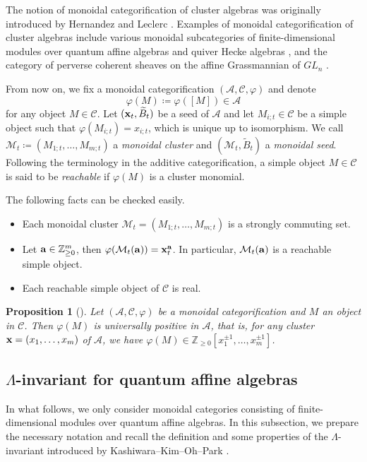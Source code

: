 \documentclass[12pt]{amsart}
\newtheorem{proposition}[theorem]{Proposition}
\theoremstyle{definition}
\theoremstyle{remark}
\numberwithin{equation}{section}
\begin{document}
The notion of monoidal categorification of cluster algebras was originally introduced by Hernandez and Leclerc \cite{HL_2010}. 
Examples of monoidal categorification of cluster algebras include various monoidal subcategories of finite-dimensional modules over quantum affine algebras and quiver Hecke algebras \cite{HL16, kkko-2018, kkop-2024}, and the category of perverse coherent sheaves on the affine Grassmannian of $GL_n$ \cite{CW19}.

From now on, we fix a monoidal categorification $(\mathcal A, \mathcal C, \varphi)$ and denote \[\varphi(M) \coloneqq \varphi([M])\in\mathcal A\]
for any object $M\in\mathcal C$. Let $({\bf x}_t,\widetilde B_t)$ be a seed of $\mathcal A$ and let $M_{i;t}\in\mathcal C$ be a simple object such that $\varphi(M_{i;t})=x_{i;t}$, which is unique up to isomorphism.  We call $\mathcal M_t \coloneqq (M_{1;t},\ldots,M_{m;t})$ a {\em monoidal cluster} and $(\mathcal M_t,\widetilde B_t)$ a {\em monoidal seed}. Following the terminology in the additive categorification, a simple object $M\in\mathcal C$ is said to be {\em reachable} if $\varphi(M)$ is a cluster monomial.


The following facts can be checked easily.
\begin{itemize}
    \item Each monoidal cluster $\mathcal M_t=(M_{1;t},\ldots,M_{m;t})$ is a strongly commuting set.
    \item Let ${\bf a}\in\mathbb Z_{\geq 0}^m$, then $\varphi(\mathcal M_t({\bf a}))={\bf x}_t^{\bf a}$. In particular, $\mathcal M_t({\bf a})$ is a reachable simple object.
    \item Each reachable simple object of $\mathcal C$ is real.
\end{itemize}
 


\begin{proposition}[{\cite[Proposition 2.2]{HL_2010}}]
\label{prop:HL_2010}
  Let $(\mathcal A, \mathcal C, \varphi)$ be a monoidal categorification and $M$ an object in $\mathcal C$. Then $\varphi(M)$ is universally positive in $\mathcal A$, that is, for any cluster ${\bf x}=(x_{1},\ldots,x_{m})$ of $\mathcal A$, we have $\varphi(M)\in\mathbb Z_{\geq 0}[x_{1}^{\pm 1},\ldots,x_{m}^{\pm 1}]$.
\end{proposition}



\subsection{$\Lambda$-invariant for quantum affine algebras}\label{Ssec:Lqaa}
In what follows, we only consider monoidal categories consisting of  finite-dimensional modules over quantum affine algebras. 
In this subsection, we prepare the necessary notation and recall the definition and some properties of the $\Lambda$-invariant introduced by Kashiwara--Kim--Oh--Park \cite{kkop-2020}.     
\end{document}
